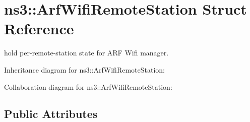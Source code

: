 \hypertarget{structns3_1_1ArfWifiRemoteStation}{}\section{ns3\+:\+:Arf\+Wifi\+Remote\+Station Struct Reference}
\label{structns3_1_1ArfWifiRemoteStation}


hold per-\/remote-\/station state for A\+RF Wifi manager.  




Inheritance diagram for ns3\+:\+:Arf\+Wifi\+Remote\+Station\+:


Collaboration diagram for ns3\+:\+:Arf\+Wifi\+Remote\+Station\+:
\subsection*{Public Attributes}
